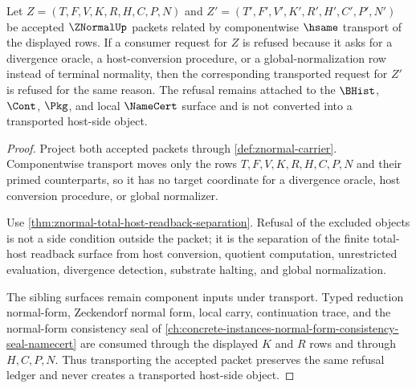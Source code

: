 \begin{theorem}
\label{thm:znormal-terminal-normality-refusal-stability}
Let $Z=(T,F,V,K,R,H,C,P,N)$ and $Z'=(T',F',V',K',R',H',C',P',N')$ be accepted $\ZNormalUp$ packets related by componentwise $\hsame$ transport of the displayed rows. If a consumer request for $Z$ is refused because it asks for a divergence oracle, a host-conversion procedure, or a global-normalization row instead of terminal normality, then the corresponding transported request for $Z'$ is refused for the same reason. The refusal remains attached to the $\BHist$, $\Cont$, $\Pkg$, and local $\NameCert$ surface and is not converted into a transported host-side object.
\end{theorem}
\begin{proof}
Project both accepted packets through \autoref{def:znormal-carrier}. Componentwise transport moves only the rows $T,F,V,K,R,H,C,P,N$ and their primed counterparts, so it has no target coordinate for a divergence oracle, host conversion procedure, or global normalizer.

Use \autoref{thm:znormal-total-host-readback-separation}. Refusal of the excluded objects is not a side condition outside the packet; it is the separation of the finite total-host readback surface from host conversion, quotient computation, unrestricted evaluation, divergence detection, substrate halting, and global normalization.

The sibling surfaces remain component inputs under transport. Typed reduction normal-form, Zeckendorf normal form, local carry, continuation trace, and the normal-form consistency seal of \autoref{ch:concrete-instances-normal-form-consistency-seal-namecert} are consumed through the displayed $K$ and $R$ rows and through $H,C,P,N$. Thus transporting the accepted packet preserves the same refusal ledger and never creates a transported host-side object.
\end{proof}

